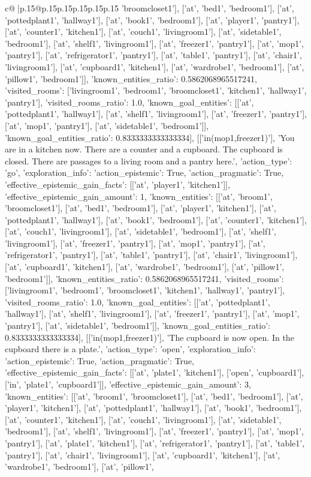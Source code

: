 \documentclass{article}
\begin{document}
{\begin{supertabular}{c@{$\;$}|p{.15\linewidth}@{}p{.15\linewidth}p{.15\linewidth}p{.15\linewidth}p{.15\linewidth}p{.15\linewidth}}
{{{'broomcloset1'], ['at', 'bed1', 'bedroom1'], ['at', 'pottedplant1', 'hallway1'], ['at', 'book1', 'bedroom1'], ['at', 'player1', 'pantry1'], ['at', 'counter1', 'kitchen1'], ['at', 'couch1', 'livingroom1'], ['at', 'sidetable1', 'bedroom1'], ['at', 'shelf1', 'livingroom1'], ['at', 'freezer1', 'pantry1'], ['at', 'mop1', 'pantry1'], ['at', 'refrigerator1', 'pantry1'], ['at', 'table1', 'pantry1'], ['at', 'chair1', 'livingroom1'], ['at', 'cupboard1', 'kitchen1'], ['at', 'wardrobe1', 'bedroom1'], ['at', 'pillow1', 'bedroom1']], 'known_entities_ratio': 0.5862068965517241, 'visited_rooms': ['livingroom1', 'bedroom1', 'broomcloset1', 'kitchen1', 'hallway1', 'pantry1'], 'visited_rooms_ratio': 1.0, 'known_goal_entities': [['at', 'pottedplant1', 'hallway1'], ['at', 'shelf1', 'livingroom1'], ['at', 'freezer1', 'pantry1'], ['at', 'mop1', 'pantry1'], ['at', 'sidetable1', 'bedroom1']], 'known_goal_entities_ratio': 0.8333333333333334}}], [['in(mop1,freezer1)'], 'You are in a kitchen now. There are a counter and a cupboard. The cupboard is closed. There are passages to a living room and a pantry here.', {'action_type': 'go', 'exploration_info': {'action_epistemic': True, 'action_pragmatic': True, 'effective_epistemic_gain_facts': [['at', 'player1', 'kitchen1']], 'effective_epistemic_gain_amount': 1, 'known_entities': [['at', 'broom1', 'broomcloset1'], ['at', 'bed1', 'bedroom1'], ['at', 'player1', 'kitchen1'], ['at', 'pottedplant1', 'hallway1'], ['at', 'book1', 'bedroom1'], ['at', 'counter1', 'kitchen1'], ['at', 'couch1', 'livingroom1'], ['at', 'sidetable1', 'bedroom1'], ['at', 'shelf1', 'livingroom1'], ['at', 'freezer1', 'pantry1'], ['at', 'mop1', 'pantry1'], ['at', 'refrigerator1', 'pantry1'], ['at', 'table1', 'pantry1'], ['at', 'chair1', 'livingroom1'], ['at', 'cupboard1', 'kitchen1'], ['at', 'wardrobe1', 'bedroom1'], ['at', 'pillow1', 'bedroom1']], 'known_entities_ratio': 0.5862068965517241, 'visited_rooms': ['livingroom1', 'bedroom1', 'broomcloset1', 'kitchen1', 'hallway1', 'pantry1'], 'visited_rooms_ratio': 1.0, 'known_goal_entities': [['at', 'pottedplant1', 'hallway1'], ['at', 'shelf1', 'livingroom1'], ['at', 'freezer1', 'pantry1'], ['at', 'mop1', 'pantry1'], ['at', 'sidetable1', 'bedroom1']], 'known_goal_entities_ratio': 0.8333333333333334}}], [['in(mop1,freezer1)'], 'The cupboard is now open. In the cupboard there is a plate.', {'action_type': 'open', 'exploration_info': {'action_epistemic': True, 'action_pragmatic': True, 'effective_epistemic_gain_facts': [['at', 'plate1', 'kitchen1'], ['open', 'cupboard1'], ['in', 'plate1', 'cupboard1']], 'effective_epistemic_gain_amount': 3, 'known_entities': [['at', 'broom1', 'broomcloset1'], ['at', 'bed1', 'bedroom1'], ['at', 'player1', 'kitchen1'], ['at', 'pottedplant1', 'hallway1'], ['at', 'book1', 'bedroom1'], ['at', 'counter1', 'kitchen1'], ['at', 'couch1', 'livingroom1'], ['at', 'sidetable1', 'bedroom1'], ['at', 'shelf1', 'livingroom1'], ['at', 'freezer1', 'pantry1'], ['at', 'mop1', 'pantry1'], ['at', 'plate1', 'kitchen1'], ['at', 'refrigerator1', 'pantry1'], ['at', 'table1', 'pantry1'], ['at', 'chair1', 'livingroom1'], ['at', 'cupboard1', 'kitchen1'], ['at', 'wardrobe1', 'bedroom1'], ['at', 'pillow1', }}}
\end{supertabular}}
\end{document}
